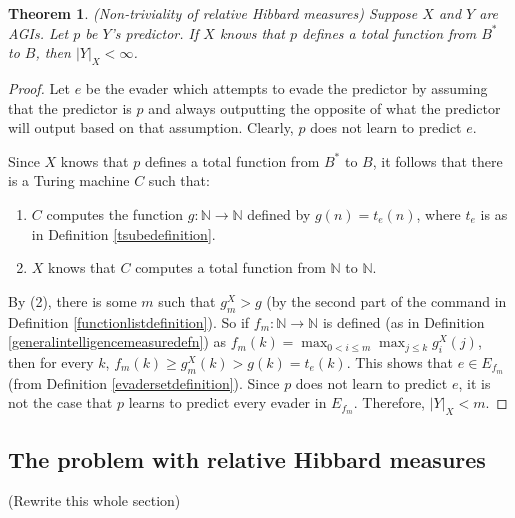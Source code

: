 \documentclass{article}
\newtheorem{theorem}{Theorem}
\begin{document}
\begin{theorem}
\label{simplehibbardnontrivialtheorem}
    (Non-triviality of relative Hibbard measures)
    Suppose $X$ and $Y$ are AGIs. Let $p$ be $Y$'s predictor.
    If $X$ knows that $p$ defines a total function from $B^*$ to $B$,
    then $|Y|_X<\infty$.
\end{theorem}

\begin{proof}
    Let $e$ be the evader which attempts to evade the predictor by assuming
    that the predictor is $p$ and always outputting the opposite of what
    the predictor will output based on that assumption. Clearly, $p$ does
    not learn to predict $e$.

    Since $X$ knows that $p$ defines a total function from $B^*$ to $B$,
    it follows that there is a Turing machine $C$ such that:
    \begin{enumerate}
        \item
        $C$ computes the function $g:\mathbb N\to \mathbb N$ defined by
        $g(n)=t_e(n)$, where $t_e$ is as in Definition \ref{tsubedefinition}.
        \item
        $X$ knows that $C$ computes a total function from $\mathbb N$ to $\mathbb N$.
    \end{enumerate}
    By (2), there is some $m$ such that $g^X_m>g$
    (by the second part of the command in Definition \ref{functionlistdefinition}).
    So if $f_m:\mathbb N\to\mathbb N$ is defined
    (as in Definition \ref{generalintelligencemeasuredefn})
    as $f_m(k)=\max_{0<i\leq m}\max_{j\leq k}g^X_i(j)$,
    then for every $k$, $f_m(k)\geq g^X_m(k)>g(k)=t_e(k)$.
    This shows that $e\in E_{f_m}$ (from Definition \ref{evadersetdefinition}).
    Since $p$ does not learn to predict $e$,
    it is not the case that $p$ learns to predict every evader in $E_{f_m}$.
    Therefore, $|Y|_X<m$.
\end{proof}

\subsection{The problem with relative Hibbard measures}
\label{problemwithsimplehibbardsection}

(Rewrite this whole section)

\end{document}
